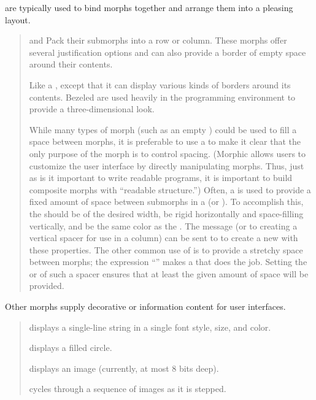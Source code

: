 \documentclass[letterpaper,10pt,english]{sphinxmanual}
\begin{document}
 are typically used to bind morphs together and arrange them into a pleasing layout.
\begin{quote}

 and   Pack their submorphs into a row or column. These morphs offer several justification options and can also provide a border of empty space around their contents.

  Like a , except that it can display various kinds of borders around its contents. Bezeled  are used heavily in the programming environment to provide a three-dimensional look.

 While many types of morph (such as an empty ) could be used to fill a space between morphs, it is preferable to use a  to make it clear that the only purpose of the morph is to control spacing. (Morphic allows users to customize the user interface by directly manipulating morphs. Thus, just as is it important to write readable programs, it is important to build composite morphs with “readable structure.”) Often, a  is used to provide a fixed amount of space between submorphs in a  (or ). To accomplish this, the  should be of the desired width, be rigid horizontally and space-filling vertically, and be the same color as the . The message  (or  to creating a vertical spacer for use in a column) can be sent to  to create a new  with these properties. The other common use of  is to provide a stretchy space between morphs; the expression “” makes a  that does the job. Setting the  or  of such a spacer ensures that at least the given amount of space will be provided.
\end{quote}

Other morphs supply decorative or information content for user interfaces.
\begin{quote}

 displays a single-line string in a single font style, size, and color.

 displays a filled circle.

 displays an image (currently, at most 8 bits deep).

 cycles through a sequence of images as it is stepped.
\end{quote}
\end{document}
